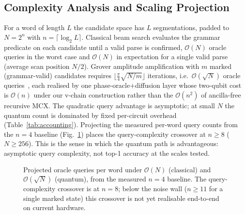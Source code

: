 \documentclass[journal]{IEEEtran}
\newcommand{\bigO}{\mathcal{O}}
\newcommand{\sqrtN}{\sqrt{N}}
\begin{document}
\subsection{Complexity Analysis and Scaling Projection}
\label{sec:scaling}
For a word of length $L$ the candidate space has $L$ segmentations, padded to
$N=2^{n}$ with $n=\lceil\log_2 L\rceil$. Classical beam search evaluates the
grammar predicate on each candidate until a valid parse is confirmed,
$\bigO(N)$ oracle queries in the worst case and $\bigO(N)$ in expectation for a
single valid parse (average scan position $N/2$). Grover amplitude amplification
with $m$ marked (grammar-valid) candidates requires
$\lfloor\frac{\pi}{4}\sqrt{N/m}\rfloor$ iterations, i.e.\ $\bigO(\sqrtN)$ oracle
queries~\cite{grover1996,bbht1998}, each realised by one phase-oracle$+$diffusion
layer whose two-qubit cost is $\bigO(n)$ under our v-chain construction rather
than the $\bigO(n^2)$ of ancilla-free recursive MCX. The quadratic query
advantage is asymptotic; at small $N$ the quantum count is dominated by fixed
per-circuit overhead (Table~\ref{tab:accounting}). Projecting the measured
per-word query counts from the $n{=}4$ baseline (Fig.~\ref{fig:scaling}) places
the query-complexity crossover at $n\!\ge\!8$ ($N\!\ge\!256$). This is the sense
in which the quantum path is advantageous: asymptotic query complexity, not
top-1 accuracy at the scales tested.

\begin{figure}[t]
\centering
{}
\caption{Projected oracle queries per word under $\bigO(N)$ (classical) and
$\bigO(\sqrtN)$ (quantum), from the measured $n{=}4$ baseline. The
query-complexity crossover is at $n{=}8$; below the noise wall
($n\!\ge\!11$ for a single marked state) this crossover is not yet realisable
end-to-end on current hardware.}
\label{fig:scaling}
\end{figure}
\end{document}
